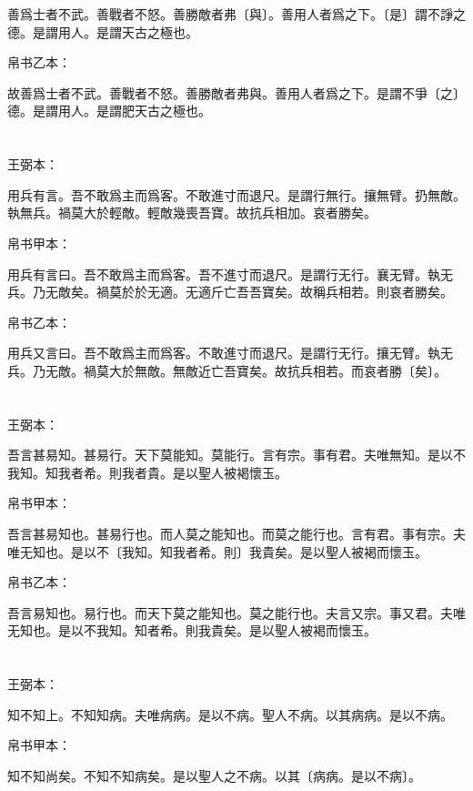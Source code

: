 \documentclass[a5paper]{ctexbook}
\begin{document}
    善爲士者不武。善戰者不怒。善勝敵者弗〔與〕。善用人者爲之下。〔是〕謂不諍之德。是謂用人。是謂天古之極也。

    帛书乙本：

    故善爲士者不武。善戰者不怒。善勝敵者弗與。善用人者爲之下。是謂不爭〔之〕德。是謂用人。是謂肥天古之極也。

    \chapter{}
    王弼本：

    用兵有言。吾不敢爲主而爲客。不敢進寸而退尺。是謂行無行。攘無臂。扔無敵。執無兵。禍莫大於輕敵。輕敵幾喪吾寶。故抗兵相加。哀者勝矣。

    
    帛书甲本：

    用兵有言曰。吾不敢爲主而爲客。吾不進寸而退尺。是謂行无行。襄无臂。執无兵。乃无敵矣。禍莫於於无適。无適斤亡吾吾寶矣。故稱兵相若。則哀者勝矣。

    帛书乙本：

    用兵又言曰。吾不敢爲主而爲客。不敢進寸而退尺。是謂行无行。攘无臂。執无兵。乃无敵。禍莫大於無敵。無敵近亡吾寶矣。故抗兵相若。而哀者勝〔矣〕。

    \chapter{}
    王弼本：

    吾言甚易知。甚易行。天下莫能知。莫能行。言有宗。事有君。夫唯無知。是以不我知。知我者希。則我者貴。是以聖人被褐懷玉。

    
    帛书甲本：

    吾言甚易知也。甚易行也。而人莫之能知也。而莫之能行也。言有君。事有宗。夫唯无知也。是以不〔我知。知我者希。則〕我貴矣。是以聖人被褐而懷玉。

    帛书乙本：

    吾言易知也。易行也。而天下莫之能知也。莫之能行也。夫言又宗。事又君。夫唯无知也。是以不我知。知者希。則我貴矣。是以聖人被褐而懷玉。

    \chapter{}
    王弼本：

    知不知上。不知知病。夫唯病病。是以不病。聖人不病。以其病病。是以不病。

    
    帛书甲本：

    知不知尚矣。不知不知病矣。是以聖人之不病。以其〔病病。是以不病〕。
\end{document}
